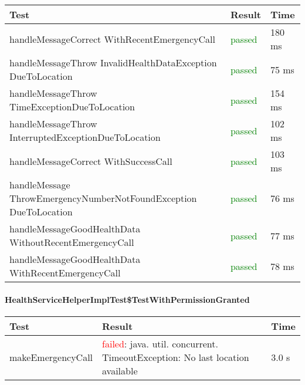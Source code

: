   \begin{adjustwidth}{1cm}{}
        \begin{longtable}{|p{}|p{}|p{}|}
            \hline
            \textbf{Test} & \textbf{Result} & \textbf{Time} \\
            \hline
            handleMessageCorrect WithRecentEmergencyCall & \textcolor{green}{passed} & 180 ms \\
            \hline
            handleMessageThrow InvalidHealthDataException DueToLocation &  \textcolor{green}{passed} & 75 ms\\
            \hline
            handleMessageThrow TimeExceptionDueToLocation & \textcolor{green}{passed} & 154 ms \\
            \hline
            handleMessageThrow InterruptedExceptionDueToLocation & \textcolor{green}{passed} & 102 ms\\
            \hline
            handleMessageCorrect WithSuccessCall & \textcolor{green}{passed} &  103 ms\\
            \hline
            handleMessage ThrowEmergencyNumberNotFoundException DueToLocation &  \textcolor{green}{passed}  &  76 ms\\
            \hline
            handleMessageGoodHealthData WithoutRecentEmergencyCall & \textcolor{green}{passed} & 77 ms\\
            \hline
            handleMessageGoodHealthData WithRecentEmergencyCall &  \textcolor{green}{passed} & 78 ms\\
            \hline
        
        \end{longtable}
    \end{adjustwidth}
    
    
\paragraph{HealthServiceHelperImplTest\$TestWithPermissionGranted}

  \begin{adjustwidth}{1cm}{}
        \begin{longtable}{|p{}|p{}|p{}|}
            \hline
            \textbf{Test} & \textbf{Result} & \textbf{Time} \\
            \hline
            makeEmergencyCall & \textcolor{red}{failed}: java. util. concurrent. TimeoutException: No last location available  & 3.0 s \\
            \hline
        
        \end{longtable}
    \end{adjustwidth}
    
